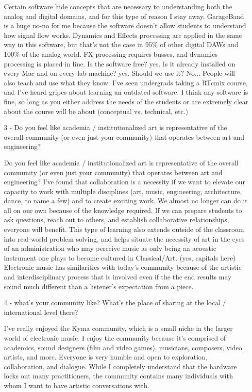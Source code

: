 	Certain software hide concepts that are necessary to understanding both the analog and digital domains, and for this type of reason I stay away.  GarageBand is a huge no-no for me because the software doesn't allow students to understand how signal flow works.  Dynamics and Effects processing are applied in the same way in this software, but that's not the case in 95\% of other digital DAWs and 100\% of the analog world.  FX processing requires busses, and dynamics processing is placed in line. Is the software free? yes.  Is it already installed on every Mac and on every lab machine? yes.  Should we use it?  No... 
	People will also teach and use what they know. I've seen undergrads taking a RTcmix course, and I've heard gripes about learning an outdated software. 
	I think any software is fine, so long as you either address the needs of the students or are extremely clear about the course will be about (conceptual vs. technical, etc.)

3 - Do you feel like academia / institutionalized art is representative of the overall community (or even just your community) that operates between art and engineering? 

Do you feel like academia / institutionalized art is representative of the overall community (or even just your community) that operates between art and engineering? 
	I've found that collaboration is a necessity if we want to elevate our capacity to work with multiple disciplines (art, music, engineering, architecture, dance, to name a few) and to create exciting work. We almost no longer can do it all on our own because of the knowledge required.  If we can prepare students to ask questions, reach out to others, and establish collaborative relationships, everyone will benefit.  This type of learning also extends outside of the classroom into real-world problem solving, and helps situate the necessity of art in the eyes of an administration who may perceive music as only being an acoustic instrument one plays to become cultured in Classical/Art. (yes, capitals here) Electronic music has similarities with today's community because of the artistic and interdisciplinary process that is involved even if the the end results may sound much different than a listener's expectation from a piece. 

4 - what's your community like? What's the place of sharing at the local / international level there? 

I've really enjoyed the Kyma community, which is a small niche in the larger world of electronic music. I enjoy the community because it's comprised of academics, sound designers (film and video games), musicians, composers, video artists, and more. Everyone is very humble and open to exploration, collaboration, and dialogue.  While I completely understand that the hardware locks out many practitioners, the community contains many individuals with whom I want to have artistic conversations with.

